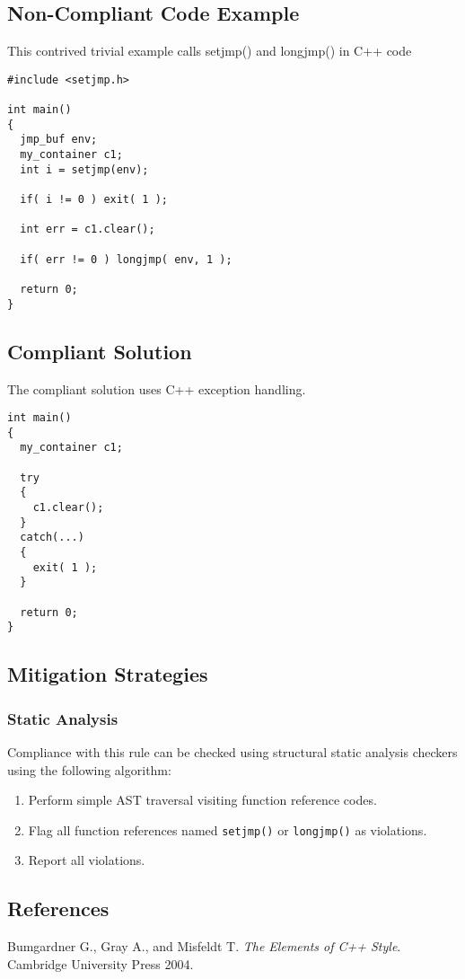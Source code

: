 \subsection{Non-Compliant Code Example}
This contrived trivial example calls setjmp() and longjmp() in C++ code

\begin{verbatim}
#include <setjmp.h>

int main()
{
  jmp_buf env;
  my_container c1;
  int i = setjmp(env);

  if( i != 0 ) exit( 1 );

  int err = c1.clear();

  if( err != 0 ) longjmp( env, 1 );

  return 0;
}
\end{verbatim}

\subsection{Compliant Solution}

The compliant solution uses C++ exception handling.

\begin{verbatim}
int main()
{
  my_container c1;

  try
  {
    c1.clear();    
  }
  catch(...)
  {
    exit( 1 );
  } 

  return 0;
}
\end{verbatim}

\subsection{Mitigation Strategies}
\subsubsection{Static Analysis} 

Compliance with this rule can be checked using structural static analysis checkers using the following algorithm:

\begin{enumerate}
\item Perform simple AST traversal visiting function reference codes.
\item Flag all function references named {\tt setjmp()} or {\tt longjmp()} as violations.
\item Report all violations.
\end{enumerate}

\subsection{References}

Bumgardner G., Gray A., and Misfeldt T. {\it The Elements of C++ Style}. Cambridge University Press 2004.
